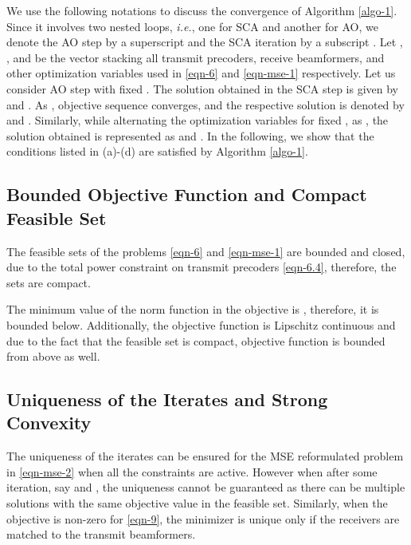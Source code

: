 We use the following notations to discuss the convergence of Algorithm \ref{algo-1}. Since it involves two nested loops, \textit{i.e.}, one for \ac{SCA} and another for \ac{AO}, we denote the \ac{AO} step by a superscript  and the \ac{SCA} iteration by a subscript . Let \me{\mx}, \me{\my}, and \me{\mz} be the vector stacking all transmit precoders, receive beamformers, and other optimization variables used in \eqref{eqn-6} and \eqref{eqn-mse-1} respectively. Let us consider \ac{AO} step  with fixed \eqn{\my}. The solution obtained in the  \ac{SCA} step is given by  and . As , objective sequence converges, and the respective solution is denoted by  and . Similarly, while alternating the optimization variables for fixed \eqn{\mx}, as , the solution obtained is represented as  and . In the following, we show that the conditions listed in (a)-(d) are satisfied by Algorithm \ref{algo-1}.

\subsection{Bounded Objective Function and Compact Feasible Set} \label{b_obj}
The feasible sets of the problems \eqref{eqn-6} and \eqref{eqn-mse-1} are bounded and closed, due to the total power constraint on transmit precoders \eqref{eqn-6.4}, therefore, the sets are compact. 

The minimum value of the norm function in the objective is , therefore, it is bounded below. Additionally, the objective function is Lipschitz continuous and due to the fact that the feasible set is compact, objective function is bounded from above as well.

\subsection{Uniqueness of the Iterates and Strong Convexity} \label{c-a}
The uniqueness of the iterates  can be ensured for the \ac{MSE} reformulated problem in \eqref{eqn-mse-2} when all the constraints are active. However when  after some iteration, say  and , the uniqueness cannot be guaranteed as there can be multiple solutions with the same objective value in the feasible set. Similarly, when the objective is non-zero for \eqref{eqn-9}, the minimizer is unique only if the receivers are matched to the transmit beamformers.

